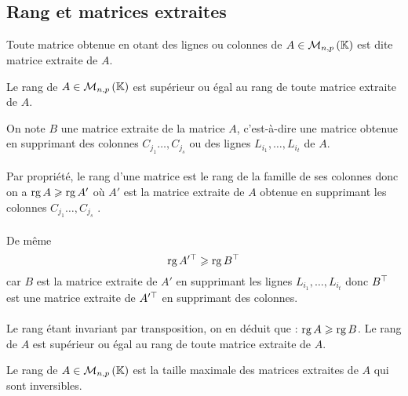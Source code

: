 \subsection{Rang et matrices extraites}
\begin{defi}
    Toute matrice obtenue en otant des lignes ou colonnes de \(A \in \M{n,p}\) est dite matrice extraite de \(A\).
\end{defi}
\begin{prop}
    Le rang de \(A \in \M{n,p}\) est supérieur ou égal au rang de toute matrice extraite de \(A\).
\end{prop}
\begin{dem}
    On note \(B\) une matrice extraite de la matrice \(A\), c’est-à-dire une matrice obtenue en supprimant des colonnes \(C_{j_1} \dots , C_{j_s}\) ou des lignes \(L_{i_1} , \dots , L_{i_t}\) de \(A\).\\~\\
    Par propriété, le rang d’une matrice est le rang de la famille de ses colonnes donc on a \(\operatorname{rg} A \geqslant \operatorname{rg} A'\)
    où \(A'\) est la matrice extraite de \(A\) obtenue en supprimant les colonnes \(C_{j_1} \dots , C_{j_s}\) .\\~\\
    De même
    \[\operatorname{rg}A'^{\top} \geqslant \operatorname{rg} B^{\top}\]
    car \(B\) est la matrice extraite de \(A'\) en supprimant les lignes \(L_{i_1} , \dots , L_{i_t}\) donc \(B^{\top}\) est une matrice extraite de \(A'^{\top}\) en supprimant des colonnes.\\~\\
    Le rang étant invariant par transposition, on en déduit que : \(\operatorname{rg} A \geqslant \operatorname{rg} B\).
    \conclusion Le rang de \(A\) est supérieur ou égal au rang de toute matrice extraite de \(A\).
\end{dem}
\begin{defprop}
Le rang de \(A \in \M{n,p}\) est la taille maximale des matrices extraites de \(A\) qui sont inversibles.
\end{defprop}
